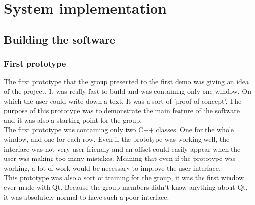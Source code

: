 \documentclass[12pt]{report}
\begin{document}
\part{System implementation}

\chapter{Building the software}
\section{First prototype}
The first prototype that the group presented to the first demo was giving an idea of the project. It was really fast to build and was containing only one window. On which the user could write down a text. It was a sort of 'proof of concept'. The purpose of this prototype was to demonstrate the main feature of the software and it was also a starting point for the group.\\
The first prototype was containing only two C++ classes. One for the whole window, and one for each row. Even if the prototype was working well, the interface was not very user-friendly and an offset could easily appear when the user was making too many mistakes.
Meaning that even if the prototype was working, a lot of work would be necessary to improve the user interface. \\
This prototype was also a sort of training for the group, it was the first window ever made with Qt. Because the group members didn't know anything about Qt, it was absolutely normal to have such a poor interface.
\end{document}
